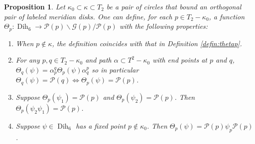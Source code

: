 \documentclass[12pt]{amsart}
\newtheorem{prop}[thm]{Proposition}
\newcommand{\calG}{\mathcal G}
\newcommand{\calP}{\mathcal P}
\newcommand{\bs}{\backslash}
\newcommand{\Dih}{\operatorname{Dih}}
\begin{document}
\begin{prop} \label{prop:dihedral}  Let $\kappa_0 \subset \kappa \subset T_2$ be a pair of circles that bound an orthogonal pair of labeled meridian disks.  One can define, for each $p \in T_2 - \kappa_0$, a function $\Theta_p: \Dih_6 \to \calP(p) \bs \calG(p)/\calP(p)$ with the following properties:
\begin{enumerate}
\item  When $p \notin \kappa$, the definition coincides with that in Definition \ref{defin:thetap}.
\item  For any $p, q \in T_2 - \kappa_0$ and path $\alpha \subset T^2 - \kappa_0$ with end points at $p$ and $q$, $\Theta_q(\psi) = \alpha_p^q \Theta_p(\psi) \alpha_q^p$ so in particular 
$\Theta_q(\psi) = \calP(q) \iff \Theta_p(\psi) = \calP(p)$.
\item  Suppose $\Theta_p (\psi_1) = \calP(p)$ and $\Theta_p (\psi_2) = \calP(p)$.  Then $\Theta_p (\psi_2 \psi_1) = \calP(p)$.
\item Suppose $\psi \in \Dih_6$ has a fixed point $p \notin \kappa_0$.  Then $\Theta_p(\psi) = \calP(p)\psi_p \calP(p)$.   
\end{enumerate}
\end{prop}
\end{document}
